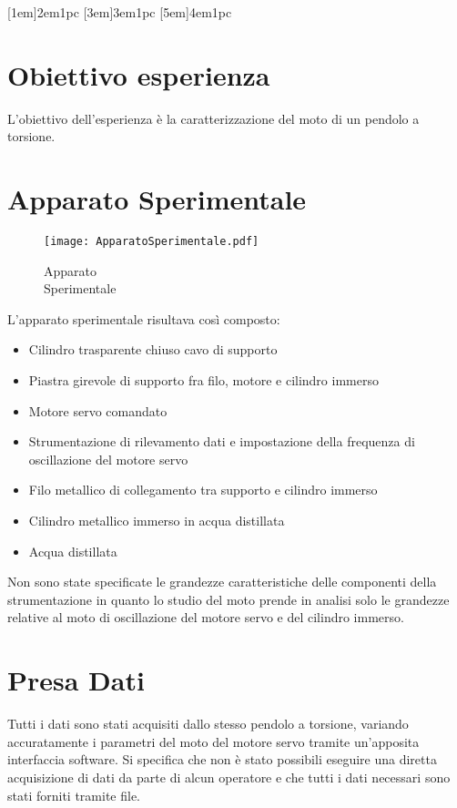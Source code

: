 \documentclass[a4paper,11pt,oneside]{article}
\begin{document}

\clearpage
\tableofcontents
{}
\contentsmargin{6em}
[1em]{\bigskip}{2em}{1pc}
[3em]{\smallskip}{3em}{1pc}
[5em]{\smallskip}{4em}{1pc}


\newpage


\section{Obiettivo esperienza}
L'obiettivo dell'esperienza è la caratterizzazione del moto di un pendolo a torsione.

\section{Apparato Sperimentale}


\begin{wrapfigure}[13]{l}{4.5cm}  
    \texttt{[image: ApparatoSperimentale.pdf]}
    \caption{Apparato \\Sperimentale}
    \label{fig:apparato_sperimentale}
\end{wrapfigure}


L'apparato sperimentale risultava così composto:
\begin{itemize}
    \item Cilindro trasparente chiuso cavo di supporto
    \item Piastra girevole di supporto fra filo, motore e cilindro immerso
    \item Motore servo comandato
    \item Strumentazione di rilevamento dati e impostazione della frequenza di oscillazione del motore servo
    \item Filo metallico di collegamento tra supporto e cilindro immerso
    \item Cilindro metallico immerso in acqua distillata
    \item Acqua distillata
\end{itemize}

Non sono state specificate le grandezze caratteristiche delle componenti della strumentazione in quanto lo studio del moto prende in analisi solo le grandezze relative al moto di oscillazione del motore servo e del cilindro immerso.
\section{Presa Dati}
Tutti i dati sono stati acquisiti dallo stesso pendolo a torsione, variando accuratamente i parametri del moto del motore servo tramite un'apposita interfaccia software. Si specifica che non è stato possibili eseguire una diretta acquisizione di dati da parte di alcun operatore e che tutti i dati necessari sono stati forniti tramite file.\newline
\end{document}
